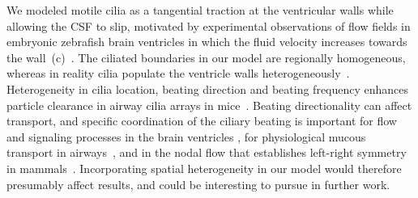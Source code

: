 \documentclass{WileyMSP-template}
\begin{document}
We modeled motile cilia as a tangential
traction at the ventricular walls
while allowing the CSF to slip,
motivated by experimental observations of
flow fields in embryonic zebrafish brain ventricles in which
the fluid velocity increases towards the
wall~(c)~\cite{Olstad2019CiliaryDevelopment}. 
The ciliated boundaries in our model are regionally homogeneous,
whereas in reality cilia populate the ventricle walls
heterogeneously~\cite{Olstad2019CiliaryDevelopment}. Heterogeneity
in cilia location, beating direction and beating frequency
enhances particle clearance in airway cilia arrays
in mice~\cite{Ramirez-SanJuan2020Multi-scaleArrays}.
Beating directionality can affect transport,
and specific coordination of the ciliary beating is important for
flow and signaling processes in the brain ventricles
\cite{Eichele2020Cilia-drivenVentricle, Olstad2019CiliaryDevelopment,
Faubel2016Cilia-basedVentricles, Guirao2010CouplingCilia, Afzelius2004CiliaRelatedDiseases,
Pellicciotta2020Cilia},
for physiological mucous transport in
airways~\cite{Rayner1996CiliarySyndrome, Schneiter2021Multi-scaleFunction,
Bustamante-Marin2019LackClearance, Tsukita2012CoordinatedFeet},
and in the nodal flow that establishes
left-right symmetry in mammals~\cite{Yoshiba2014RolesSymmetry, Hirokawa2006NodalAsymmetry, Sawamoto2006NewBrain}.
Incorporating spatial heterogeneity in our model would
therefore presumably affect results, and could be
interesting to pursue in further work.
\end{document}
